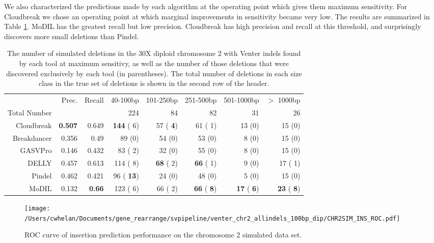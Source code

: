 \documentclass[11pt]{article}
\begin{document}
We also characterized the predictions made by each algorithm at the operating point which gives them maximum sensitivity. For Cloudbreak we chose an operating point at which marginal improvements in sensitivity became very low. The results are summarized in Table \ref{chr2DeletionPredsMaxSensitivity}. MoDIL has the greatest recall but low precision. Cloudbreak has high precision and recall at this threshold, and surprisingly discovers more small deletions than Pindel.

\begin{table}[t]
\begin{center}
\begin{tabular}{rrr|rrrrr}
  \hline
                        & Prec. & Recall & 40-100bp  & 101-250bp  & 251-500bp & 501-1000bp & $>$ 1000bp \\ 
 Total Number &          &           & 224 &  84 & 82 &  31 & 26\\ 
  \hline
  Cloudbreak    &  \textbf{0.507} & 0.649 & \textbf{ 144} (   6)  &   57 (\textbf{   4}) &    61 (   1) &   13 (0) &   15 (0) \\ 
  Breakdancer   &  0.356 & 0.49 &   89 (0)  &   54 (0) &    53 (0) &    8 (0) &   15 (0) \\ 
  GASVPro        & 0.146 & 0.432 &   83 (   2)  &   32 (0) &    55 (0) &    8 (0) &   15 (0) \\ 
  DELLY           & 0.457 & 0.613 &  114 (   8)  & \textbf{  68} (   2) &  \textbf{  66} (   1) &    9 (0) &   17 (   1) \\ 
  Pindel           & 0.462 & 0.421 &   96 (\textbf{  13})  &   24 (0) &    48 (0) &    5 (0) &   15 (0)\\ 
  MoDIL           & 0.132  & \textbf{0.66} &  123 (   6)  &   66 (   2) &  \textbf{  66} (\textbf{   8}) & \textbf{  17} (\textbf{   6}) & \textbf{  23} (\textbf{   8})\\ 
   \hline
\end{tabular}
\end{center}
\caption{The number of simulated deletions in the 30X diploid chromosome 2 with Venter indels found by each tool at maximum sensitivy, as well as the number of those deletions that were discovered exclusively by each tool (in parentheses). The total number of deletions in each size class in the true set of deletions is shown in the second row of the header.}
\label{chr2DeletionPredsMaxSensitivity}
\end{table}

\begin{figure}[b]
\centering
\texttt{[image: /Users/cwhelan/Documents/gene\_rearrange/svpipeline/venter\_chr2\_allindels\_100bp\_dip/CHR2SIM\_INS\_ROC.pdf]}
\caption{ROC curve of insertion prediction performance on the chromosome 2 simulated data set.}
\label{chr2InsertionsRoc}
\end{figure}
\end{document}
